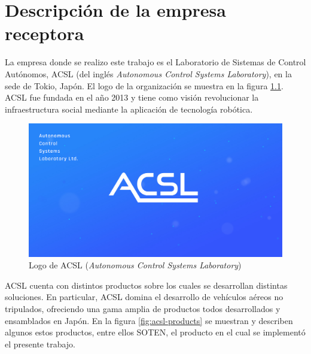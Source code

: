 \chapter{Descripción de la empresa receptora}
\label{capitulo2}

La empresa donde se realizo este trabajo es el Laboratorio de Sistemas de Control Autónomos, ACSL (del inglés \textit{Autonomous Control Systems Laboratory}), en la sede de Tokio, Japón. El logo de la organización se muestra en la figura \ref{fig:acsl-logo}. ACSL fue fundada en el año 2013 y tiene como visión revolucionar la infraestructura social mediante la aplicación de tecnología robótica.

\begin{figure}[H]
    \centering
    \includegraphics[scale=0.25]{partes/ImgJoao/logo-acsl.jpg}
    \caption[Logo de ACSL (\textit{Autonomous Control Systems Laboratory})]{Logo de ACSL (\textit{Autonomous Control Systems Laboratory})}
    \label{fig:acsl-logo}
\end{figure}

ACSL cuenta con distintos productos sobre los cuales se desarrollan distintas soluciones. En particular, ACSL domina el desarrollo de vehículos aéreos no tripulados, ofreciendo una gama amplia de productos todos desarrollados y ensamblados en Japón. En la figura \ref{fig:acsl-products} se muestran y describen algunos estos productos, entre ellos SOTEN, el producto en el cual se implementó el presente trabajo.

